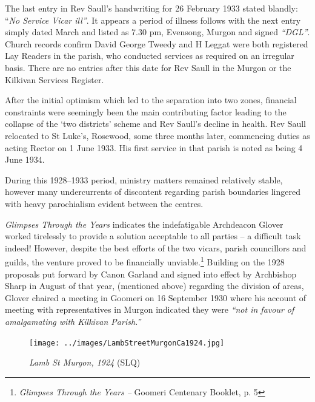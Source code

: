 The last entry in Rev Saull's handwriting for 26 February 1933 stated blandly: ``\emph{No Service Vicar ill''}. It appears a period of illness follows with the next entry simply dated March and listed as 7.30 pm, Evensong, Murgon and signed \emph{``DGL''}. Church records confirm David George Tweedy and H Leggat were both registered Lay Readers in the parish, who conducted services as required on an irregular basis. There are no entries after this date for Rev Saull in the Murgon or the Kilkivan Services Register.



After the initial optimism which led to the separation into two zones, financial constraints were seemingly been the main contributing factor leading to the collapse of the `two districts' scheme and Rev Saull's decline in health. Rev Saull relocated to St Luke's, Rosewood, some three months later, commencing duties as acting Rector on 1 June 1933. His first service in that parish is noted as being 4 June 1934.



During this 1928--1933 period, ministry matters remained relatively stable, however many undercurrents of discontent regarding parish boundaries lingered with heavy parochialism evident between the centres.



\emph{Glimpses Through the Years} indicates the indefatigable Archdeacon Glover worked tirelessly to provide a solution acceptable to all parties -- a difficult task indeed! However, despite the best efforts of the two vicars, parish councillors and guilds, the venture proved to be financially unviable.\footnote{\emph{Glimpses Through the Years --} Goomeri Centenary Booklet, p. 5} Building on the 1928 proposals put forward by Canon Garland and signed into effect by Archbishop Sharp in August of that year, (mentioned above) regarding the division of areas, Glover chaired a meeting in Goomeri on 16 September 1930 where his account of meeting with representatives in Murgon indicated they were \emph{``not in favour of amalgamating with Kilkivan Parish.''}








\begin{figure}[htb]
\begin{center}
\texttt{[image: ../images/LambStreetMurgonCa1924.jpg]}
\caption{{\itshape Lamb St Murgon, 1924} {\scriptsize(SLQ)}}
\end{center}
\end{figure}


